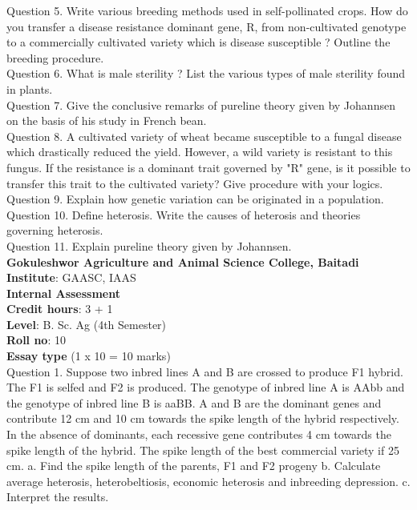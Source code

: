 \documentclass[12pt]{article}\usepackage[]{graphicx}\usepackage[]{color}
\begin{document}
Question 5. Write various breeding methods used in self-pollinated crops. How do you transfer a disease resistance dominant gene, R, from non-cultivated genotype to a commercially cultivated variety which is disease susceptible ? Outline the breeding procedure.\\
Question 6. What is male sterility ? List the various types of male sterility found in plants.\\
Question 7. Give the conclusive remarks of pureline theory given by Johannsen on the basis of his study in French bean.\\
Question 8. A cultivated variety of wheat became susceptible to a fungal disease which drastically reduced the yield. However, a wild variety is resistant to this fungus. If the resistance is a dominant trait governed by "R" gene, is it possible to transfer this trait to the cultivated variety? Give procedure with your logics.\\
Question 9. Explain how genetic variation can be originated in a population.\\
Question 10. Define heterosis. Write the causes of heterosis and theories governing heterosis.\\
Question 11. Explain pureline theory given by Johannsen.\\
\clearpage 
{\centering \Large{\textbf{Gokuleshwor Agriculture and Animal Science College, Baitadi}} \\[0.25cm]
            \textbf{Institute}: GAASC, IAAS \\[0.2cm]
            \textbf{Internal Assessment} \\[0.2cm]} 
\textbf{Credit hours}: 3 + 1 \\ 
\textbf{Level}: B. Sc. Ag (4th Semester) \\
\textbf{Roll no}: 10 \\[0.5cm] 
\textbf{Essay type} (1 x 10 = 10 marks) \\
Question 1. Suppose two inbred lines A and B are crossed to produce F1 hybrid. The F1 is selfed and F2 is produced. The genotype of inbred line A is AAbb and the genotype of inbred line B is aaBB. A and B are the dominant genes and contribute 12 cm and 10 cm towards the spike length of the hybrid respectively. In the absence of dominants, each recessive gene contributes 4 cm towards the spike length of the hybrid. The spike length of the best commercial variety if 25 cm. a. Find the spike length of the parents, F1 and F2 progeny b. Calculate average heterosis, heterobeltiosis, economic heterosis and inbreeding depression. c. Interpret the results.\\
\end{document}
